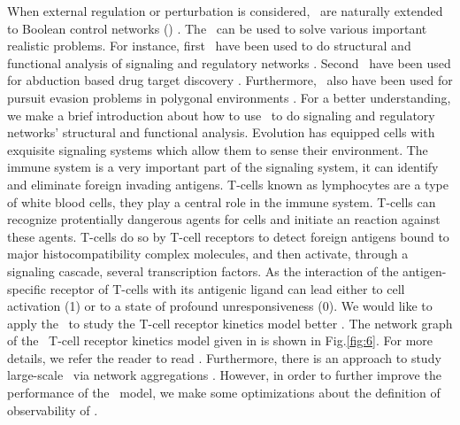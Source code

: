 When external regulation or perturbation is considered, \BNs\ are naturally extended to Boolean control networks (\BCNs) \cite{Ideker2001A}. The \BCNs\ can be used to solve various important realistic problems. For instance, first \BCNs\ have been used to do structural and functional analysis of  signaling and regulatory networks \cite{Kaufman1999A, Klamt2006A}. Second \BCNs\ have been used for abduction based drug target discovery \cite{Biane2017Abduction}. Furthermore, \BCNs\ also have been used for pursuit evasion problems in polygonal environments \cite{Thunberg2011A}. For a better understanding, we make a brief introduction about how to use \BCNs\ to do signaling and regulatory networks' structural and functional analysis. Evolution has equipped cells with exquisite signaling systems which allow them to sense their environment. The immune system is a very important part of the signaling system, it can identify and eliminate foreign invading antigens. T-cells known as lymphocytes are a type of white blood cells, they play a central role in the immune system. T-cells can recognize protentially dangerous agents for cells and initiate an reaction against these agents. T-cells do so by T-cell receptors to detect foreign antigens bound to major histocompatibility complex molecules, and then activate, through a signaling cascade, several transcription factors. As the interaction of the antigen-specific receptor of T-cells with its antigenic ligand can lead either to cell activation (1) or to a state of profound unresponsiveness (0). We would like to apply the \BCNs\ to study the T-cell receptor kinetics model better \cite{Kaufman1999A, Klamt2006A}. The network graph of the \BCN\ T-cell receptor kinetics model given in \cite{Klamt2006A} is shown in Fig.\ref{fig:6}. For more details, we refer the reader to read \cite{Klamt2006A}. Furthermore, there is an approach to study large-scale \BCNs\ via network aggregations \cite{Zhang2017Observability}. However, in order to further improve the performance of the \BCN\ model, we make some optimizations about the definition of observability of \BCNs.
